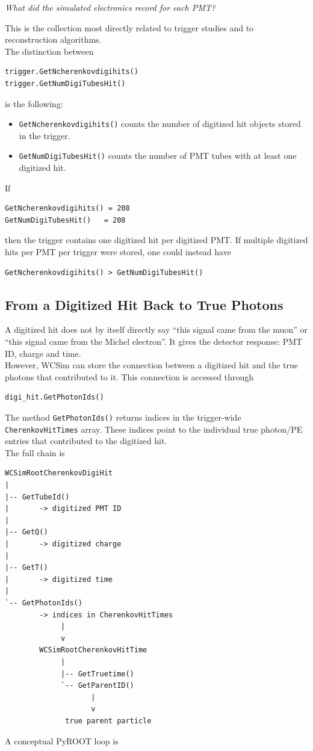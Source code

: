 \documentclass{article}
\numberwithin{table}{subsection}
\numberwithin{figure}{subsection}
\numberwithin{equation}{subsection}
\numberwithin{footnote}{subsection}
\begin{document}
\begin{center}
\emph{What did the simulated electronics record for each PMT?}
\end{center}
This is the collection most directly related to trigger studies and to
reconstruction algorithms.\\
The distinction between
\begin{lstlisting}
trigger.GetNcherenkovdigihits()
trigger.GetNumDigiTubesHit()
\end{lstlisting}
is the following:
\begin{itemize}
    \item \texttt{GetNcherenkovdigihits()} counts the number of digitized hit
    objects stored in the trigger.
    \item \texttt{GetNumDigiTubesHit()} counts the number of PMT tubes with at
    least one digitized hit.
\end{itemize}
If
\begin{lstlisting}
GetNcherenkovdigihits() = 208
GetNumDigiTubesHit()   = 208
\end{lstlisting}
then the trigger contains one digitized hit per digitized PMT. If multiple digitized hits per PMT per trigger were stored, one could instead have
\begin{lstlisting}
GetNcherenkovdigihits() > GetNumDigiTubesHit()
\end{lstlisting}

\subsection{From a Digitized Hit Back to True Photons}

A digitized hit does not by itself directly say ``this signal came from the
muon'' or ``this signal came from the Michel electron''. It gives the detector
response: PMT ID, charge and time.\\
However, WCSim can store the connection between a digitized hit and the true
photons that contributed to it. This connection is accessed through
\begin{lstlisting}
digi_hit.GetPhotonIds()
\end{lstlisting}
The method \texttt{GetPhotonIds()} returns indices in the trigger-wide
\texttt{CherenkovHitTimes} array. These indices point to the individual true
photon/PE entries that contributed to the digitized hit.\\
The full chain is

\begin{lstlisting}
WCSimRootCherenkovDigiHit
|
|-- GetTubeId()
|       -> digitized PMT ID
|
|-- GetQ()
|       -> digitized charge
|
|-- GetT()
|       -> digitized time
|
`-- GetPhotonIds()
        -> indices in CherenkovHitTimes
             |
             v
        WCSimRootCherenkovHitTime
             |
             |-- GetTruetime()
             `-- GetParentID()
                    |
                    v
              true parent particle
\end{lstlisting}
A conceptual PyROOT loop is
\end{document}
